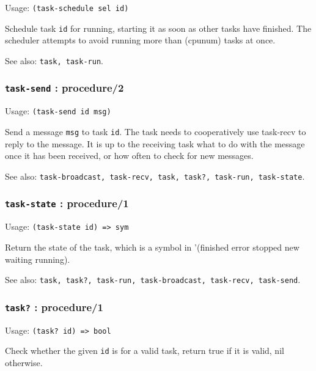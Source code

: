 \documentclass[
]{article}
\newcommand{\passthrough}[1]{#1}
\begin{document}
Usage: \passthrough{\lstinline!(task-schedule sel id)!}

Schedule task \passthrough{\lstinline!id!} for running, starting it as
soon as other tasks have finished. The scheduler attempts to avoid
running more than (cpunum) tasks at once.

See also: \passthrough{\lstinline!task, task-run!}.

\hypertarget{task-send-procedure2}{%
\subsubsection{\texorpdfstring{\texttt{task-send} :
procedure/2}{task-send : procedure/2}}\label{task-send-procedure2}}

Usage: \passthrough{\lstinline!(task-send id msg)!}

Send a message \passthrough{\lstinline!msg!} to task
\passthrough{\lstinline!id!}. The task needs to cooperatively use
task-recv to reply to the message. It is up to the receiving task what
to do with the message once it has been received, or how often to check
for new messages.

See also:
\passthrough{\lstinline!task-broadcast, task-recv, task, task?, task-run, task-state!}.

\hypertarget{task-state-procedure1}{%
\subsubsection{\texorpdfstring{\texttt{task-state} :
procedure/1}{task-state : procedure/1}}\label{task-state-procedure1}}

Usage: \passthrough{\lstinline!(task-state id) => sym!}

Return the state of the task, which is a symbol in '(finished error
stopped new waiting running).

See also:
\passthrough{\lstinline!task, task?, task-run, task-broadcast, task-recv, task-send!}.

\hypertarget{task-procedure1-1}{%
\subsubsection{\texorpdfstring{\texttt{task?} :
procedure/1}{task? : procedure/1}}\label{task-procedure1-1}}

Usage: \passthrough{\lstinline!(task? id) => bool!}

Check whether the given \passthrough{\lstinline!id!} is for a valid
task, return true if it is valid, nil otherwise.
\end{document}

